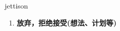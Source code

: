 
\begin{frame}
{\huge jettison}
\begin{center}
\begin{enumerate}\Large
  \item \textbf{放弃，拒绝接受(想法、计划等)}
\end{enumerate}
\end{center}
\end{frame}

